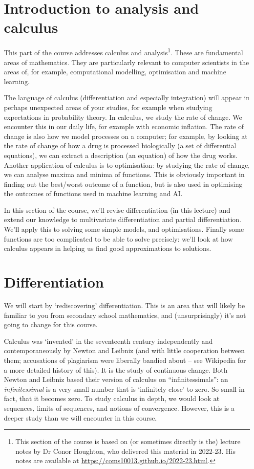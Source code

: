 \documentclass[12pt]{article}
\begin{document}
\section*{Introduction to analysis and calculus}
This part of the course addresses calculus and analysis\footnote{This section of the course is based on (or sometimes directly is the) lecture notes by Dr Conor Houghton, who delivered this material in 2022-23. His notes are available at \url{https://coms10013.github.io/2022-23.html}. }. These are fundamental areas of mathematics. They are particularly relevant to computer scientists in the areas of, for example, computational modelling, optimisation and machine learning. 

The language of calculus (differentiation and especially integration) will appear in perhaps unexpected areas of your studies, for example when studying expectations in probability theory. In calculus, we study the rate of change. We encounter this in our daily life, for example with economic inflation. The rate of change is also how we model processes on a computer; for example, by looking at the rate of change of how a drug is processed biologically (a set of differential equations), we can extract a description (an equation) of how the drug works. %
Another application of calculus is to optimisation: by studying the rate of change, we can analyse maxima and minima of functions. This is obviously important in finding out the best/worst outcome of a function, but is also used in optimising the outcomes of functions used in machine learning and AI. 

In this section of the course, we'll revise differentiation (in this lecture) and extend our knowledge to multivariate differentiation and partial differentiation. We'll apply this to solving some simple models, and optimisations. Finally some functions are too complicated to be able to solve precisely: we'll look at how calculus appears in helping us find good approximations to solutions.




\section*{Differentiation}
We will start by `rediscovering' differentiation. This is an area that will likely be familiar to you from secondary school mathematics, and (unsurprisingly) it's not going to change for this course. 

Calculus was `invented' in the seventeenth century independently and contemporaneously by Newton and Leibniz (and with little cooperation between them; accusations of plagiarism were liberally bandied about -- see Wikipedia for a more detailed history of this). It is the study of continuous change. 
Both Newton and Leibniz based their version of calculus on ``infinitessimals'': an \textsl{infinitessimal} is a very small number that is `infinitely close' to zero. So small in fact, that it becomes zero. To study calculus in depth, we would look at sequences, limits of sequences, and notions of convergence. However, this is a deeper study than we will encounter in this course. 
\end{document}
